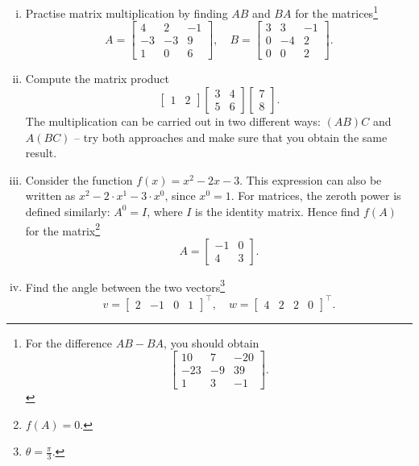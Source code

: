 \begin{exercise}
\begin{enumerate}[(i)]
	\item Practise matrix multiplication by finding $AB$ and $BA$ for the matrices\footnote{For the difference $AB-BA$, you should obtain
	\[ \begin{bmatrix}
	10 & 7 & -20 \\ -23 & -9 & 39 \\ 1 & 3 & -1 
	\end{bmatrix}. \]} 
	\[ A = \begin{bmatrix}
	4 & 2 & -1 \\ -3 & -3 & 9 \\ 1 & 0 & 6
	\end{bmatrix}, \quad B = \begin{bmatrix}
	3 & 3 & -1 \\ 0 & -4 & 2 \\ 0 & 0 & 2
	\end{bmatrix}. \]
	\item Compute the matrix product 
	\[ \begin{bmatrix} 1 & 2 \end{bmatrix} 
	\begin{bmatrix} 3 & 4 \\ 5 & 6 \end{bmatrix}
	\begin{bmatrix} 7 \\ 8 \end{bmatrix}. \]
	The multiplication can be carried out in two different ways: $(AB)C$ and $A(BC)$ -- try both approaches and make sure that you obtain the same result.
	\item Consider the function $f(x)=x^2-2x-3$. This expression can also be written as $x^2 - 2 \cdot x^1 - 3 \cdot x^0$, since $x^0=1$. For matrices, the zeroth power is defined similarly: $A^0=I$, where $I$ is the identity matrix. Hence find $f(A)$ for the matrix\footnote{$f(A)=0$.}
	\[ A = \begin{bmatrix} -1 & 0 \\ 4 & 3	\end{bmatrix}. \]
	\item Find the angle between the two vectors\footnote{$\theta = \tfrac{\pi}{3}$.}
	\[ v = \begin{bmatrix} 2 & -1 & 0 & 1 \end{bmatrix}^\top,
	\quad w = \begin{bmatrix} 4 & 2 & 2 & 0 \end{bmatrix}^\top. \]

\end{enumerate}
\end{exercise}
